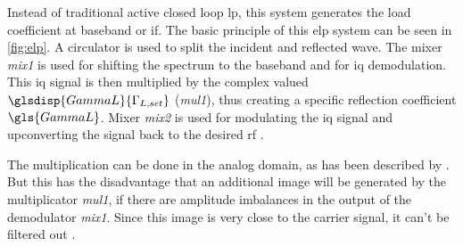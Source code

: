 \documentclass[12pt,a4paper,parskip=full,abstract=true,BCOR=12mm,twoside,open=right]{scrreprt}
\def\device#1{\mbox{\textit{#1}}}
\begin{document}
Instead of traditional active closed loop \gls{lp}, this system generates the
load coefficient at baseband or \gls{if}. The basic principle of this \gls{elp} system
can be seen in \cref{fig:elp}. A circulator is used to split the incident and
reflected wave. The mixer \device{mix1} is used for shifting the spectrum to
the baseband and for \gls{iq} demodulation. This \gls{iq} signal is then
multiplied by the complex valued $\glsdisp{GammaL}{\Gamma_{L,set}}$ (\device{mul1}), thus creating a specific
reflection coefficient $\gls{GammaL}$. Mixer \device{mix2} is used for modulating
the \gls{iq} signal and upconverting the signal back to the desired \gls{rf} \cite{williams_experimental_2005}.

The multiplication can be done in the analog domain, as has been described
by \cite{williams_experimental_2005}. But this has the disadvantage that
an additional image will be generated by the multiplicator \device{mul1},
if there are amplitude imbalances in the output
of the demodulator \device{mix1}. Since this image is very close to the
carrier signal, it can't be filtered out \cite{hashmi_agile_2010}.
\end{document}
